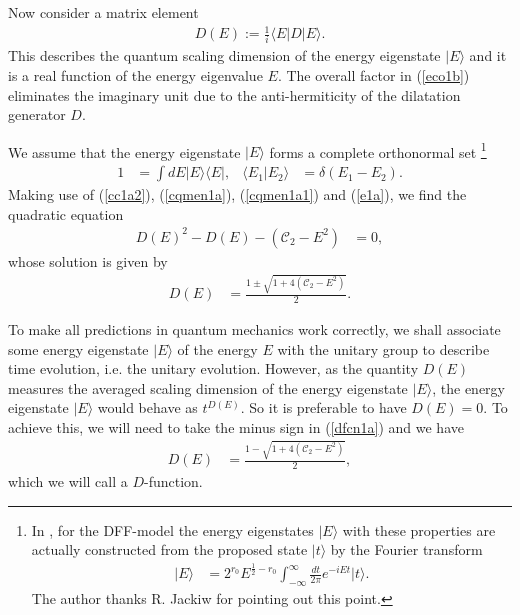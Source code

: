 \documentclass[12pt]{article}
\numberwithin{equation}{section}
\begin{document}
Now consider a matrix element
\begin{align}
\label{eco1b}
D(E):=\frac{1}{i}\langle E|D|E\rangle. 
\end{align}
This describes the quantum scaling dimension 
of the energy eigenstate $|E\rangle$ 
and it is a real function of the energy eigenvalue $E$. 
The overall factor in (\ref{eco1b}) eliminates the imaginary unit due to the anti-hermiticity of 
the dilatation generator $D$. 

We assume that 
the energy eigenstate $|E\rangle$ forms a complete orthonormal set 
\footnote{
In \cite{Jackiw:2012ur}, for the DFF-model 
the energy eigenstates $|E\rangle$ with these properties are actually constructed from the proposed state $|t\rangle$ 
by the Fourier transform 
\begin{align}
\label{tstate1a}
|E\rangle&=
2^{r_{0}}E^{\frac12-r_{0}}
\int_{-\infty}^{\infty}
\frac{dt}{2\pi}e^{-iEt}|t\rangle. 
\end{align}
The author thanks R. Jackiw for pointing out this point. 
}
\begin{align}
\label{e1a}
1&=\int dE |E\rangle \langle E|,& 
\langle E_{1}|E_{2}\rangle&=\delta(E_{1}-E_{2}). 
\end{align}
Making use of 
(\ref{cc1a2}), (\ref{cqmen1a}), (\ref{cqmen1a1}) and (\ref{e1a}), 
we find the quadratic equation
\begin{align}
\label{dfcn1a0}
D(E)^{2}-D(E)-(\mathcal{C}_{2}-E^{2})&=0, 
\end{align}
whose solution is given by 
\begin{align}
\label{dfcn1a}
D(E)&=
\frac{1\pm\sqrt{1+4(\mathcal{C}_{2}-E^{2})}}{2}. 
\end{align}














%
To make all predictions in quantum mechanics work correctly, 
we shall associate some energy eigenstate $|E\rangle$ of the energy $E$ with the unitary group 
to describe time evolution, i.e. the unitary evolution. 
However, as the quantity $D(E)$ measures the averaged scaling dimension of the energy eigenstate $|E\rangle$,  
the energy eigenstate $|E\rangle$ would behave as $t^{D(E)}$. 
So it is preferable to have $D(E)=0$. 
To achieve this, we will need to take the minus sign in (\ref{dfcn1a}) 
and we have
\begin{align}
\label{dfcn2a}
D(E)&=\frac{1-\sqrt{1+4(\mathcal{C}_{2}-E^{2})}}{2},
\end{align}
which we will call a $D$-function. 
\end{document}
